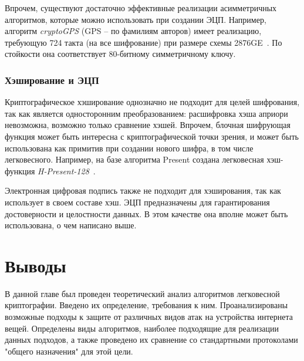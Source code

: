 Впрочем, существуют достаточно эффективные реализации асимметричных алгоритмов, которые можно использовать при создании ЭЦП. Например, алгоритм \textit{cryptoGPS} (GPS – по фамилиям авторов) имеет реализацию, требующую 724 такта (на все шифрование) при размере схемы 2876GE~\cite{src51}. По стойкости она соответствует 80-битному симметричному ключу.

\subsubsection{Хэширование и ЭЦП}

Криптографическое хэширование однозначно не подходит для целей шифрования, так как является односторонним преобразованием: расшифровка хэша априори невозможна, возможно только сравнение хэшей. Впрочем, блочная шифрующая функция может быть интересна с криптографической точки зрения, и может быть использована как примитив при создании нового шифра, в том числе легковесного. Например, на базе алгоритма Present создана легковесная хэш-функция \textit{H-Present-128}~\cite{src52}.

Электронная цифровая подпись также не подходит для хэширования, так как использует в своем составе хэш. ЭЦП предназначены для гарантирования достоверности и целостности данных. В этом качестве она вполне может быть использована, о чем написано выше.

\section{Выводы} \label{ch2:conclusion}

В данной главе был проведен теоретический анализ алгоритмов легковесной криптографии. Введено их определение, требования к ним. Проанализированы возможные подходы к защите от различных видов атак на устройства интернета вещей. Определены виды алгоритмов, наиболее подходящие для реализации данных подходов, а также проведено их сравнение со стандартными протоколами "общего назначения" для этой цели.

\newpage

%
